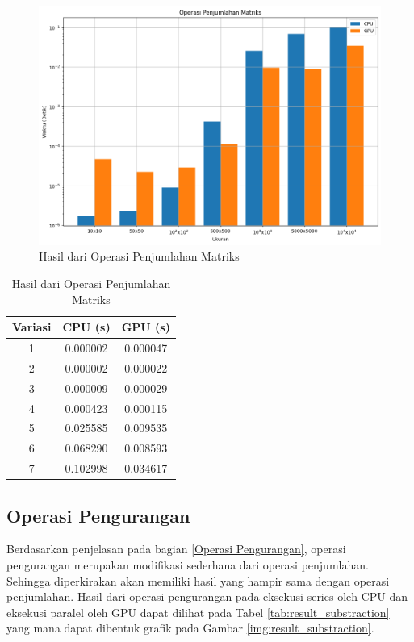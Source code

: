 \begin{figure}[H]
	\centering
	\includegraphics[width=14cm, scale=1]{images/penelitian/addition.png}
	\caption{Hasil dari Operasi Penjumlahan Matriks}
	\label{img:result_addition}
\end{figure}

\begin{table}[H]
	\centering
	\caption{Hasil dari Operasi Penjumlahan Matriks}
	\label{tab:result_addition}
	\begin{tabular}{ccc}
		\toprule
		Variasi & CPU (s)  & GPU (s)  \\
		\midrule
		1       & 0.000002 & 0.000047 \\
		2       & 0.000002 & 0.000022 \\
		3       & 0.000009 & 0.000029 \\
		4       & 0.000423 & 0.000115 \\
		5       & 0.025585 & 0.009535 \\
		6       & 0.068290 & 0.008593 \\
		7       & 0.102998 & 0.034617 \\
		\bottomrule
	\end{tabular}
\end{table}

\subsection{Operasi Pengurangan}

Berdasarkan penjelasan pada bagian \ref{Operasi Pengurangan}, operasi pengurangan merupakan modifikasi sederhana dari operasi penjumlahan. Sehingga diperkirakan akan memiliki hasil yang hampir sama dengan operasi penjumlahan. Hasil dari operasi pengurangan pada eksekusi series oleh CPU dan eksekusi paralel oleh GPU dapat dilihat pada Tabel \ref{tab:result_substraction} yang mana dapat dibentuk grafik pada Gambar \ref{img:result_substraction}.

